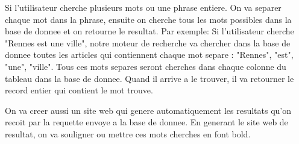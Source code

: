 Si l'utilisateur cherche plusieurs mots ou une phrase entiere. On va separer chaque mot dans la phrase, ensuite on cherche tous les mots possibles dans la base de donnee et on retourne le resultat. Par exemple: Si l'utilisateur cherche "Rennes est une ville", notre moteur de recherche va chercher dans la base de donnee toutes les articles qui contiennent chaque mot separe : "Rennes", "est", "une", "ville". Tous ces mots separes seront cherches dans chaque colonne du tableau dans la base de donnee. Quand il arrive a le trouver, il va retourner le record entier qui contient le mot trouve. 

On va creer aussi un site web qui genere automatiquement les resultats qu'on recoit par la requette envoye a la base de donnee. En generant le site web de resultat, on va souligner ou mettre ces mots cherches en font bold.  